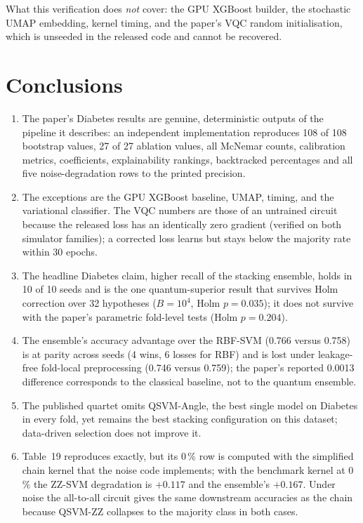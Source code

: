 \documentclass[11pt,a4paper]{article}
\newcommand{\tabdir}{../reimplementation/tex/}
\begin{document}

What this verification does \emph{not} cover: the GPU XGBoost builder, the stochastic UMAP embedding, kernel timing, and the paper's VQC random initialisation, which is unseeded in the released code and cannot be recovered.

\section{Conclusions}
\begin{enumerate}[nosep]
  \item The paper's Diabetes results are genuine, deterministic outputs of the pipeline it describes: an independent implementation reproduces 108 of 108 bootstrap values, 27 of 27 ablation values, all McNemar counts, calibration metrics, coefficients, explainability rankings, backtracked percentages and all five noise-degradation rows to the printed precision.
  \item The exceptions are the GPU XGBoost baseline, UMAP, timing, and the variational classifier. The VQC numbers are those of an untrained circuit because the released loss has an identically zero gradient (verified on both simulator families); a corrected loss learns but stays below the majority rate within 30 epochs.
  \item The headline Diabetes claim, higher recall of the stacking ensemble, holds in 10 of 10 seeds and is the one quantum-superior result that survives Holm correction over 32 hypotheses ($B=10^4$, Holm $p=0.035$); it does not survive with the paper's parametric fold-level tests (Holm $p=0.204$).
  \item The ensemble's accuracy advantage over the RBF-SVM (0.766 versus 0.758) is at parity across seeds (4 wins, 6 losses for RBF) and is lost under leakage-free fold-local preprocessing (0.746 versus 0.759); the paper's reported 0.0013 difference corresponds to the classical baseline, not to the quantum ensemble.
  \item The published quartet omits QSVM-Angle, the best single model on Diabetes in every fold, yet remains the best stacking configuration on this dataset; data-driven selection does not improve it.
  \item Table~19 reproduces exactly, but its 0\,\% row is computed with the simplified chain kernel that the noise code implements; with the benchmark kernel at 0\,\% the ZZ-SVM degradation is $+0.117$ and the ensemble's $+0.167$. Under noise the all-to-all circuit gives the same downstream accuracies as the chain because QSVM-ZZ collapses to the majority class in both cases.
\end{enumerate}
\end{document}
